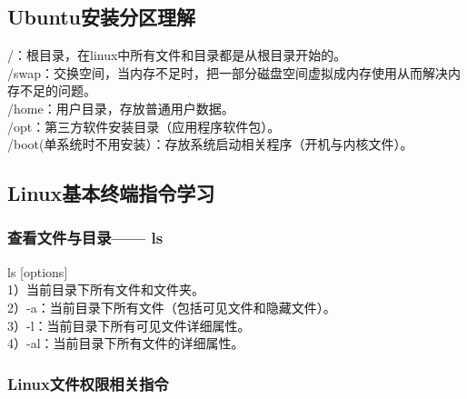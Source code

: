 \documentclass[12pt]{article}
\begin{document}
\subsection{Ubuntu安装分区理解}
\begin{flushleft}
\slash{}：根目录，在linux中所有文件和目录都是从根目录开始的。\\
\slash{}swap：交换空间，当内存不足时，把一部分磁盘空间虚拟成内存使用从而解决内存不足的问题。\\
\slash{}home：用户目录，存放普通用户数据。\\
\slash{}opt：第三方软件安装目录（应用程序软件包）。\\
\slash{}boot(单系统时不用安装）：存放系统启动相关程序（开机与内核文件）。
\subsection{Linux基本终端指令学习}
\subsubsection{查看文件与目录——{} ls}
ls [options]\\
1）当前目录下所有文件和文件夹。\\
2）-a：当前目录下所有文件（包括可见文件和隐藏文件）。\\
3）-l：当前目录下所有可见文件详细属性。\\
4）-al：当前目录下所有文件的详细属性。
\subsubsection{Linux文件权限相关指令}
\end{flushleft}
\end{document}
